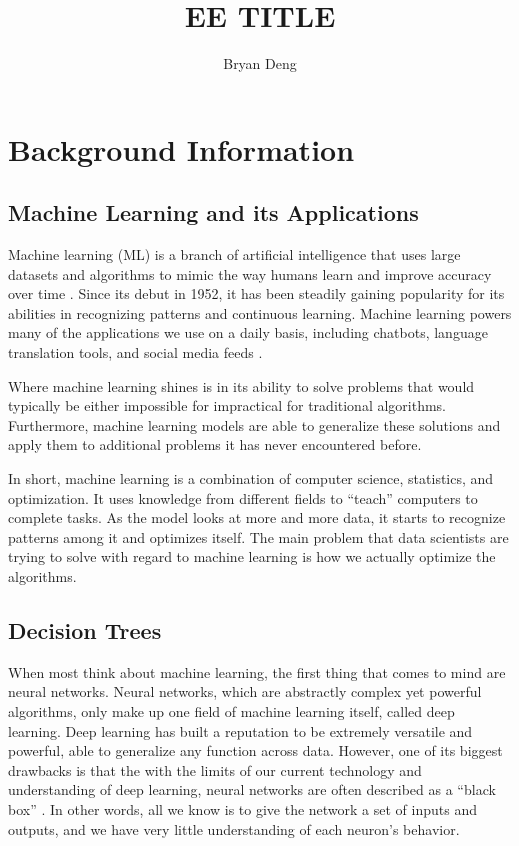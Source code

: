 \documentclass[12pt]{article}
\title{EE TITLE}
\author{Bryan Deng}
\date{}
\begin{document}
\maketitle
\newpage
\tableofcontents
\newpage

\section{Background Information}

\subsection{Machine Learning and its Applications}

Machine learning (ML) is a branch of artificial intelligence that uses large datasets and algorithms to mimic the way humans learn and improve accuracy over time \cite{what_is_ml_ibm}. Since its debut in 1952, it has been steadily gaining popularity for its abilities in recognizing patterns and continuous learning. Machine learning powers many of the applications we use on a daily basis, including chatbots, language translation tools, and social media feeds \cite{what_is_ml_mit}.

Where machine learning shines is in its ability to solve problems that would typically be either impossible for impractical for traditional algorithms. Furthermore, machine learning models are able to generalize these solutions and apply them to additional problems it has never encountered before.

In short, machine learning is a combination of computer science, statistics, and optimization. It uses knowledge from different fields to ``teach'' computers to complete tasks. As the model looks at more and more data, it starts to recognize patterns among it and optimizes itself. The main problem that data scientists are trying to solve with regard to machine learning is how we actually optimize the algorithms.

\subsection{Decision Trees}

When most think about machine learning, the first thing that comes to mind are neural networks. Neural networks, which are abstractly complex yet powerful algorithms, only make up one field of machine learning itself, called deep learning. Deep learning has built a reputation to be extremely versatile and powerful, able to generalize any function across data. However, one of its biggest drawbacks is that the with the limits of our current technology and understanding of deep learning, neural networks are often described as a ``black box'' \cite{Buhrmester_Munch_Arens_2019}. In other words, all we know is to give the network a set of inputs and outputs, and we have very little understanding of each neuron's behavior.
\end{document}
